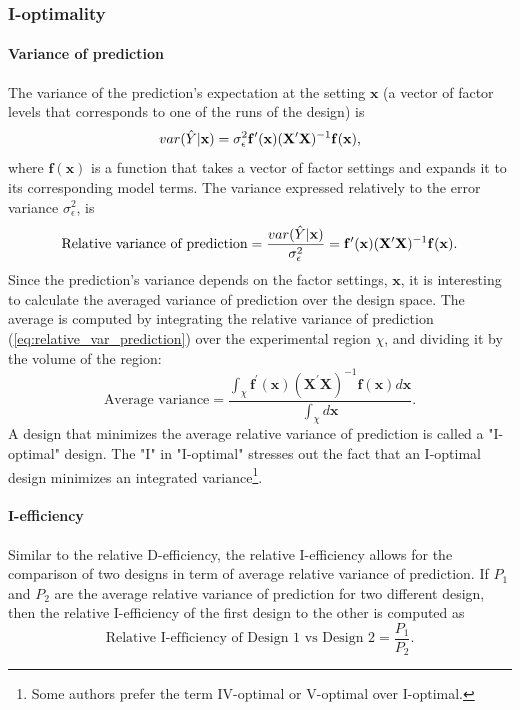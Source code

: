\subsubsection{I-optimality}
\paragraph{Variance of prediction}
The variance of the prediction's expectation at the setting $\mathbf{x}$ (a vector of factor levels that corresponds to one of the runs of the design) is 
\begin{equation}
    var(\Hat{Y}\vert\mathbf{x}) = \sigma_{\epsilon}^2\mathbf{f}^{\prime}(\mathbf{x})(\mathbf{X}^{\prime}\mathbf{X})^{-1}\mathbf{f}(\mathbf{x})
    \text{,}
\end{equation}
where $\mathbf{f}(\mathbf{x})$ is a function that takes a vector of factor settings and expands it to its corresponding model terms. The variance expressed relatively to the error variance $\sigma^2_{\epsilon}$, is
\begin{equation}
    \text{Relative variance of prediction}=
    \dfrac{var(\Hat{Y}\vert\mathbf{x})}{\sigma^2_{\epsilon}}=
    \mathbf{f}^{\prime}(\mathbf{x})(\mathbf{X}^{\prime}\mathbf{X})^{-1}\mathbf{f}(\mathbf{x})
    \text{.}
    \label{eq:relative_var_prediction}
\end{equation}
Since the prediction's variance depends on the factor settings, $\mathbf{x}$, it is interesting to calculate the averaged variance of prediction over the design space. The average is computed by integrating the relative variance of prediction (\ref{eq:relative_var_prediction}) over the experimental region $\chi$, and dividing it by the volume of the region:
\begin{equation}
    \text{Average variance}=
    \dfrac{\int_{\chi}\mathbf{f}^{\prime}(\mathbf{x})(\mathbf{X}^{\prime}\mathbf{X})^{-1}\mathbf{f}(\mathbf{x}) d\mathbf{x}}
    {\int_{\chi}d\mathbf{x}}
    \text{.}
\end{equation}
A design that minimizes the average relative variance of prediction is called a "I-optimal" design. The "I" in "I-optimal" stresses out the fact that an I-optimal design minimizes an integrated variance\footnote{Some authors prefer the term IV-optimal or V-optimal over I-optimal.}.

\paragraph{I-efficiency}
Similar to the relative D-efficiency, the relative I-efficiency allows for the comparison of two designs in term of average relative variance of prediction. If $P_1$ and $P_2$ are the average relative variance of prediction for two different design, then the relative I-efficiency of the first design to the other is computed as 
\begin{equation}
    \text{Relative I-efficiency of Design 1 vs Design 2} = 
    \dfrac{P_1}{P_2}
    \text{.}
\end{equation}

